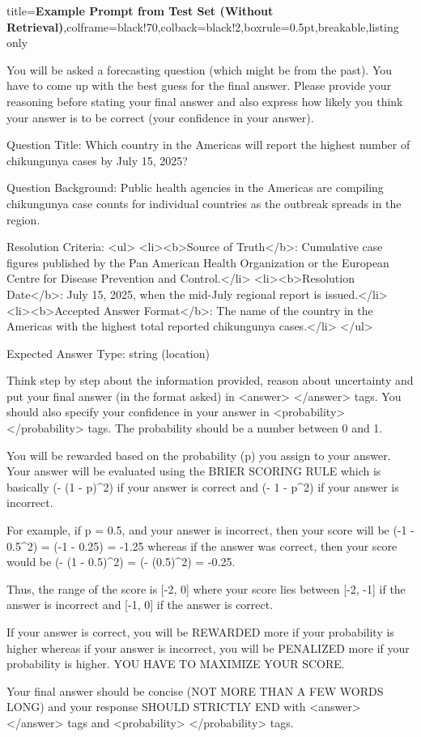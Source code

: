 \documentclass{article} %
\begin{document}
\begin{tcblisting}{title={\textbf{Example Prompt from Test Set (Without Retrieval)}},colframe=black!70,colback=black!2,boxrule=0.5pt,breakable,listing only}

You will be asked a forecasting question (which might be from the past).
You have to come up with the best guess for the final answer.
Please provide your reasoning before stating your final answer and also express how likely you think your answer is to be correct (your confidence in your answer).

Question Title:
Which country in the Americas will report the highest number of chikungunya cases by July 15, 2025?

Question Background:
Public health agencies in the Americas are compiling chikungunya case counts for individual countries as the outbreak spreads in the region.

Resolution Criteria:
<ul>
  <li><b>Source of Truth</b>: Cumulative case figures published by the Pan American Health Organization or the European Centre for Disease Prevention and Control.</li>
  <li><b>Resolution Date</b>: July 15, 2025, when the mid-July regional report is issued.</li>
  <li><b>Accepted Answer Format</b>: The name of the country in the Americas with the highest total reported chikungunya cases.</li>
</ul>

Expected Answer Type:
string (location)

Think step by step about the information provided, reason about uncertainty and put your final answer (in the format asked) in <answer> </answer> tags.
You should also specify your confidence in your answer in <probability> </probability> tags.
The probability should be a number between 0 and 1.

You will be rewarded based on the probability (p) you assign to your answer.
Your answer will be evaluated using the BRIER SCORING RULE which is basically (- (1 - p)^2) if your answer is correct and (- 1 - p^2) if your answer is incorrect.

For example, if p = 0.5, and your answer is incorrect, then your score will be (-1 - 0.5^2) = (-1 - 0.25) = -1.25
whereas if the answer was correct, then your score would be (- (1 - 0.5)^2) = (- (0.5)^2) = -0.25.

Thus, the range of the score is [-2, 0] where your score lies between [-2, -1] if the answer is incorrect and [-1, 0] if the answer is correct.

If your answer is correct, you will be REWARDED more if your probability is higher whereas if your answer is incorrect, you will be PENALIZED more if your probability is higher.
YOU HAVE TO MAXIMIZE YOUR SCORE.

Your final answer should be concise (NOT MORE THAN A FEW WORDS LONG) and your response SHOULD STRICTLY END with <answer> </answer> tags and <probability> </probability> tags.


\end{tcblisting}
\end{document}
